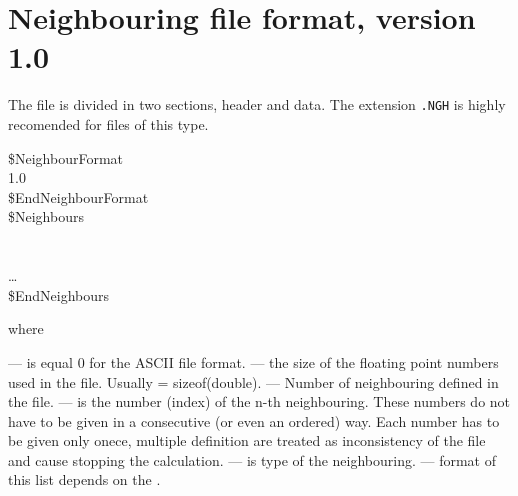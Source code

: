 
\section*{Neighbouring file format, version 1.0}
The file is divided in two sections, header and data.
The extension {\tt .NGH} is highly recomended for files of this type.
\begin{fileformat}
\$NeighbourFormat\\
  1.0  \\
\$EndNeighbourFormat\\
\$Neighbours\\
  \\
    \\
  \dots\\
\$EndNeighbours\\
\end{fileformat}
where
\begin{description}
  --- is equal 0 for the ASCII file format.
  --- the size of the floating point numbers used in
  the file. Usually  = sizeof(double).
  --- Number of neighbouring defined in the
  file.
  --- is the number (index) of the n-th
  neighbouring. These numbers do not have to be given in a consecutive (or even an
  ordered) way. Each number has to be given only onece, multiple definition
  are treated as inconsistency of the file and cause stopping the
  calculation.
  --- is type of the neighbouring. 
  --- format of this list depends on the
  .
\end{description}
